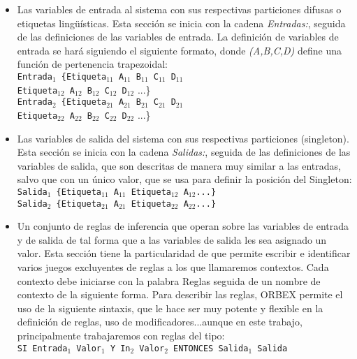 \begin{itemize}
    
    \item Las variables de entrada al sistema con sus respectivas particiones difusas o etiquetas lingüísticas. Esta sección se inicia con la cadena \textit{Entradas:}, seguida de las definiciones de las variables de entrada. La definición de variables de entrada se hará siguiendo el siguiente formato, donde \textit{(A,B,C,D)} define una función de pertenencia
    trapezoidal:\\\texttt{Entrada$_{1}$   \{Etiqueta$_{11}$ A$_{11}$ B$_{11}$ C$_{11}$ D$_{11}$ \\Etiqueta$_{12}$ A$_{12}$ B$_{12}$ C$_{12}$ D$_{12}$}
    ...\}\\\texttt{Entrada$_{2}$   \{Etiqueta$_{21}$ A$_{21}$ B$_{21}$ C$_{21}$ D$_{21}$ \\Etiqueta$_{22}$ A$_{22}$ B$_{22}$ C$_{22}$ D$_{22}$}
    ...\}
    
    \item Las variables de salida del sistema con sus respectivas particiones (singleton). Esta sección se inicia con la cadena \textit{Salidas:}, seguida de las definiciones de las variables de salida, que son descritas de manera muy similar a las entradas, salvo que con un único valor, que se usa para definir la posición del
    Singleton:\\\texttt{Salida$_{1}$   \{Etiqueta$_{11}$ A$_{11}$  Etiqueta$_{12}$ A$_{12}$...\}}\\\texttt{Salida$_{2}$   \{Etiqueta$_{21}$ A$_{21}$  Etiqueta$_{22}$ A$_{22}$...\}}
    
    \item Un conjunto de reglas de inferencia que operan sobre las variables de entrada y de salida de tal forma que a las variables de salida les sea asignado un valor. Esta sección tiene la particularidad de que permite escribir e identificar varios juegos excluyentes de reglas a los que llamaremos contextos. Cada contexto debe iniciarse con la palabra  Reglas seguida de un nombre de contexto de la siguiente forma. Para describir las reglas, \gls{ORBEX} permite el uso de la siguiente sintaxis, que le hace ser muy potente y flexible en la definición de reglas, uso de modificadores...aunque en este trabajo, principalmente trabajaremos con reglas del tipo:
    \\\texttt{SI Entrada$_{1}$ Valor$_{1}$ Y In$_{2}$ Valor$_{2}$ ENTONCES Salida$_{1}$ Salida}
\end{itemize}

